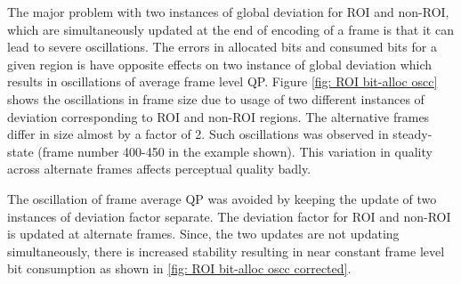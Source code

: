 \documentclass[11pt]{article} %
\begin{document}
The major problem with two instances of global deviation for ROI and non-ROI, which are simultaneously updated at the end of encoding of a frame is that it can lead to severe oscillations. The errors in allocated bits and consumed bits for a given region is have opposite effects on two instance of global deviation which results in oscillations of average frame level QP. Figure \ref{fig: ROI bit-alloc oscc} shows the oscillations in frame size due to usage of two different instances of deviation corresponding to ROI and non-ROI regions. The alternative frames differ in size almost by a factor of 2. Such oscillations was observed in steady-state (frame number 400-450 in the example shown). This variation in quality across alternate frames affects perceptual quality badly. 

The oscillation of frame average QP was avoided by keeping the update of two instances of deviation factor separate. The deviation factor for ROI and non-ROI is updated at alternate frames. Since, the two updates are not updating simultaneously, there is increased stability resulting in near constant frame level bit consumption as shown in \ref{fig: ROI bit-alloc oscc corrected}.
\end{document}
